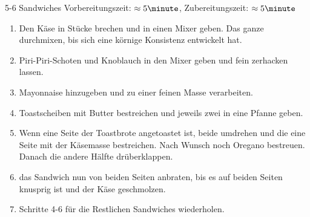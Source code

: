 5-6 Sandwiches \hfill Vorbereitungszeit: $\approx5 \minute$, Zubereitungszeit: $\approx5 \minute$
\hspace{0em}\\
\begin{enumerate}
\item   Den Käse in Stücke brechen und in einen Mixer geben. Das ganze durchmixen, bis
        sich eine körnige Konsistenz entwickelt hat.
\item   Piri-Piri-Schoten und Knoblauch in den Mixer geben und fein zerhacken lassen.
\item   Mayonnaise hinzugeben und zu einer feinen Masse verarbeiten.
\item   Toastscheiben mit Butter bestreichen und jeweils zwei in eine Pfanne geben.
\item   Wenn eine Seite der Toastbrote angetoastet ist, beide umdrehen und die eine Seite
        mit der Käsemasse bestreichen. Nach Wunsch noch Oregano bestreuen. Danach die andere
        Hälfte drüberklappen.
\item   das Sandwich nun von beiden Seiten anbraten, bis es auf beiden Seiten knusprig ist und
        der Käse geschmolzen.
\item   Schritte 4-6 für die Restlichen Sandwiches wiederholen.
\end{enumerate}

